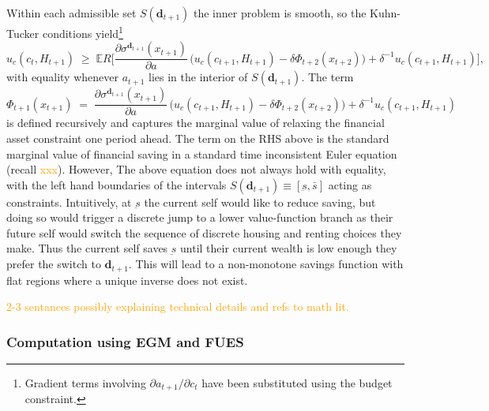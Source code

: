 \documentclass[12pt]{article}
\begin{document}
Within each admissible set $S(\mathbf d_{t+1})$ the inner problem is smooth,
so the Kuhn-Tucker conditions yield\footnote{%
  Gradient terms involving $\partial a_{t+1}/\partial c_{t}$ have been
  substituted using the budget constraint.}
\begin{equation}\label{eq:Euler_gen}
  u_{c}(c_{t},H_{t+1})
  \;\ge\;
  \mathbb{E}R\bigl[
    \frac{\partial\sigma^{\mathbf d_{t+1}}(x_{t+1})}{\partial a}\,
    \bigl(
      u_{c}(c_{t+1},H_{t+1})
      -\delta\Phi_{t+2}(x_{t+2})
    \bigr)
    +\delta^{-1}u_{c}(c_{t+1},H_{t+1})
  \bigr],
\end{equation}
with equality whenever $a_{t+1}$ lies in the interior of
$S(\mathbf d_{t+1})$. The term
%
\begin{equation}\label{eq:lambda_presentbias_gen}
  \Phi_{t+1}(x_{t+1})
    \;=\;
   \frac{\partial\sigma^{\mathbf d_{t+1}}(x_{t+1})}{\partial a}\,
    \bigl(
      u_{c}(c_{t+1},H_{t+1}) - 
      \delta\Phi_{t+2}(x_{t+2})
    \bigr)
    +\delta^{-1}u_{c}(c_{t+1},H_{t+1})
\end{equation}
%
%
is defined recursively and captures the marginal value of relaxing the financial
asset constraint one period ahead. The term on the RHS above is the standard marginal value of financial saving in a standard time inconsistent Euler equation (recall \textcolor{orange}{xxx}). However, The above equation does not always hold with equality, with the left hand boundaries of the intervals $S(\mathbf d_{t+1})\equiv [\underbar{s}, \bar{s}]$ acting as constraints. Intuitively, at $\underbar{s}$ the current self would like to
reduce saving, but doing so would trigger a discrete jump to a lower
value-function branch as their future self would switch the sequence of discrete housing and renting choices they make. Thus the current self saves $\underbar{s}$ until their current wealth is low enough they prefer the switch to $\mathbf{d}_{t+1}$. This will lead to a non-monotone savings function with flat regions where a unique inverse does not exist. 

\textcolor{orange}{2-3 sentances possibly explaining technical details and refs to math lit.}


\subsubsection{Computation using EGM and FUES}\label{sec: egm_app_3}
\end{document}
